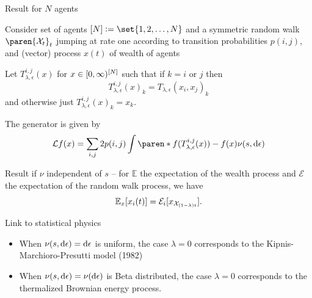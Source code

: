 \documentclass[9pt]{beamer}
\begin{document}
\begin{frame}{Result for $N$ agents}

Consider set of agents $\brackets{N} \defeq \set{1, 2, \hdots, N}$ and a symmetric random walk $\paren{\mathcal{X}_t}_t$ jumping at rate one according to transition probabilities $p(i,j)$, and (vector) process $x(t)$ of wealth of agents

\pause

Let $T_{\lambda, \epsilon}^{i, j}(x)$ for $x \in [0, \infty)^{[N]}$ such that if $k = i$ or $j$ then
\[
T_{\lambda, \epsilon}^{i, j}(x)_k = T_{\lambda, \epsilon}(x_i, x_j)_k
\]
and otherwise just $T_{\lambda, \epsilon}^{i, j}(x)_k = x_k$.

\pause

The generator is given by
\[
\mathcal{L}f(x) = \sum_{i, j} 2 p(i, j) \int \paren*{f(T_{\lambda, \epsilon}^{i, j}(x)) - f(x)} \nu(s, \diff \epsilon)
\]

\pause

Result if $\nu$ independent of $s$ -- for $\mathbb{E}$ the expectation of the wealth process and $\mathcal{E}$ the expectation of the random walk process, we have
\[
\mathbb{E}_x[x_i(t)] = \mathcal{E}_i[x_{\mathcal{X}_{(1-\lambda)t}}].
\]
\end{frame}




\begin{frame}{Link to statistical physics}
\begin{itemize}
    \item When $\nu(s, \mathop{}\!\mathrm{d} \epsilon) = \mathop{}\!\mathrm{d}\epsilon$ is uniform, the case $\lambda=0$ corresponds to the Kipnis-Marchioro-Presutti model (1982)
    \item When $\nu(s, \mathop{}\!\mathrm{d} \epsilon) = \nu(\mathop{}\!\mathrm{d}\epsilon)$ is Beta distributed, the case $\lambda=0$ corresponds to the thermalized Brownian energy process.
\end{itemize}
\end{frame}
\end{document}
